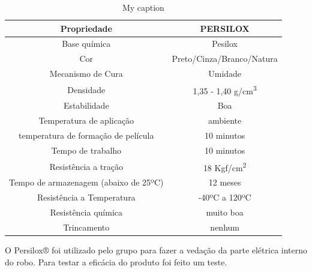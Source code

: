 \begin{table}[]
\centering
\caption{My caption}
\label{my-label}
\begin{tabular}{@{}|c|c|@{}}
\toprule
Propriedade                           & PERSILOX                  \\ \midrule
Base química                          & Pesilox                   \\ \midrule
Cor                                   & Preto/Cinza/Branco/Natura \\ \midrule
Mecanismo de Cura                     & Umidade                   \\ \midrule
Densidade                             & 1,35 - 1,40 g/cm\textsuperscript{3}         \\ \midrule
Estabilidade                          & Boa                       \\ \midrule
Temperatura de aplicação              & ambiente                  \\ \midrule
temperatura de formação de película   & 10 minutos                \\ \midrule
Tempo de trabalho                     & 10 minutos                \\ \midrule
Resistência a tração                  & 18 Kgf/cm\textsuperscript{2}                \\ \midrule
Tempo de armazenagem (abaixo de 25ºC) & 12 meses                  \\ \midrule
Resistência a Temperatura             & -40ºC a 120ºC             \\ \midrule
Resistência química                   & muito boa                 \\ \midrule
Trincamento                           & nenhum                    \\ \bottomrule
\end{tabular}
\end{table}

O Persilox® foi utilizado pelo grupo para fazer a vedação da parte elétrica interno do robo. Para testar a eficácia do produto foi feito um teste.

